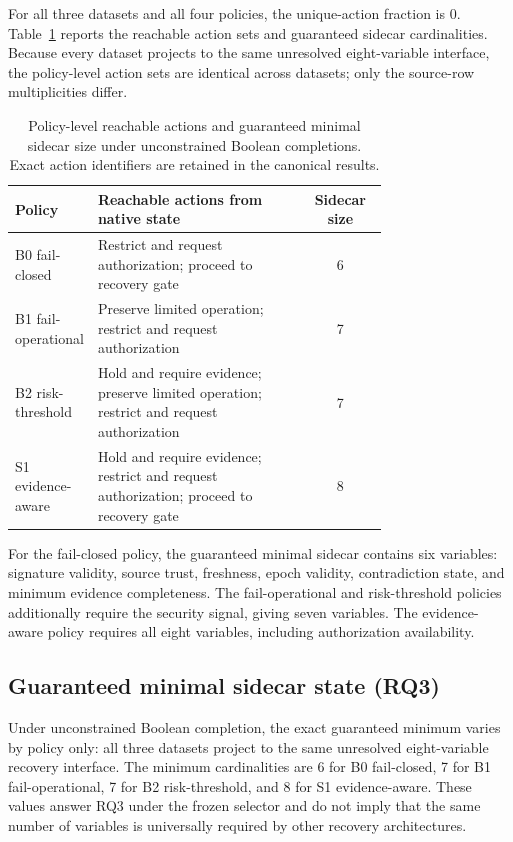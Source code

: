 \documentclass[preprint,12pt]{elsarticle}
\begin{document}
For all three datasets and all four policies, the unique-action fraction is 0. Table~\ref{tab:policies} reports the reachable action sets and guaranteed sidecar cardinalities. Because every dataset projects to the same unresolved eight-variable interface, the policy-level action sets are identical across datasets; only the source-row multiplicities differ.

\begin{table}[htbp]
\centering
\small
\caption{Policy-level reachable actions and guaranteed minimal sidecar size under unconstrained Boolean completions. Exact action identifiers are retained in the canonical results.}
\label{tab:policies}
\begin{tabular}{>{\raggedright\arraybackslash}p{0.18\linewidth}>{\raggedright\arraybackslash}p{0.56\linewidth}c}
\toprule
Policy & Reachable actions from native state & Sidecar size \\
\midrule
B0 fail-closed &
Restrict and request authorization; proceed to recovery gate & 6 \\
B1 fail-operational &
Preserve limited operation; restrict and request authorization & 7 \\
B2 risk-threshold &
Hold and require evidence; preserve limited operation; restrict and request authorization & 7 \\
S1 evidence-aware &
Hold and require evidence; restrict and request authorization; proceed to recovery gate & 8 \\
\bottomrule
\end{tabular}
\end{table}

For the fail-closed policy, the guaranteed minimal sidecar contains six variables: signature validity, source trust, freshness, epoch validity, contradiction state, and minimum evidence completeness. The fail-operational and risk-threshold policies additionally require the security signal, giving seven variables. The evidence-aware policy requires all eight variables, including authorization availability.

\subsection{Guaranteed minimal sidecar state (RQ3)}

Under unconstrained Boolean completion, the exact guaranteed minimum varies by policy only: all three datasets project to the same unresolved eight-variable recovery interface. The minimum cardinalities are 6 for B0 fail-closed, 7 for B1 fail-operational, 7 for B2 risk-threshold, and 8 for S1 evidence-aware. These values answer RQ3 under the frozen selector and do not imply that the same number of variables is universally required by other recovery architectures.
\end{document}
